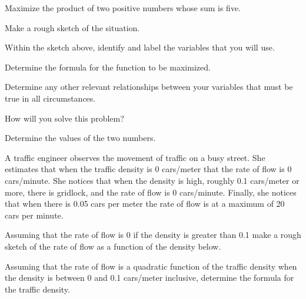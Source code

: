 \begin{problem}

\item Maximize the product of two positive numbers whose sum is five.
\begin{subproblem}
  \item Make a rough sketch of the situation.
    \vfill
  \item Within the sketch above, identify and label the variables
    that you will use.
  \item Determine the formula for the function to be maximized.
    \vfill
  \item Determine any other relevant relationships between your variables that must be true in all circumstances.
    \vfill
  \item How will you solve this problem?
    \vfill
  \item Determine the values of the two numbers.
    \vfill
    \vfill
\end{subproblem}

  \clearpage

\item A traffic engineer observes the movement of traffic on a busy
  street. She estimates that when the traffic density is 0 cars/meter
  that the rate of flow is 0 cars/minute. She notices that when the
  density is high, roughly 0.1 cars/meter or more, there is gridlock,
  and the rate of flow is 0 cars/minute. Finally, she notices that
  when there is 0.05 cars per meter the rate of flow is at a maximum
  of 20 cars per minute.
  \begin{subproblem}
  \item Assuming that the rate of flow is 0 if the density is greater
    than 0.1 make a rough sketch of the rate of flow as a function of
    the density below.
    \vfill
  \item Assuming that the rate of flow is a quadratic function of the
    traffic density when the density is between 0 and 0.1 cars/meter
    inclusive, determine the formula for the traffic density.
    \vfill
  \end{subproblem}

  \clearpage


\end{problem}
